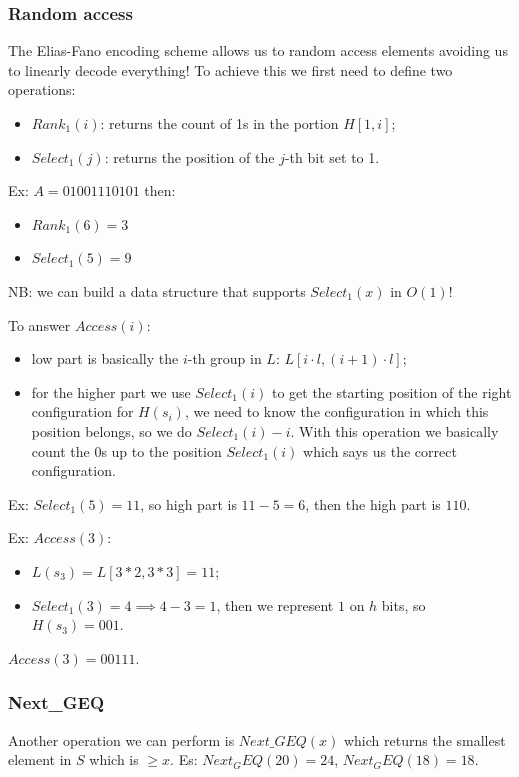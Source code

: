 \subsubsection{Random access}
The Elias-Fano encoding scheme allows us to random access elements avoiding us to linearly decode everything!
To achieve this we first need to define two operations:
\begin{itemize}
    \item $Rank_1(i)$: returns the count of 1s in the portion $H[1, i]$;
    \item $Select_1(j)$: returns the position of the $j$-th bit set to 1.
\end{itemize}

Ex: $A = 01001110101$ then:
\begin{itemize}
    \item $Rank_1(6) = 3$
    \item $Select_1(5) = 9$
\end{itemize}

NB: we can build a data structure that supports $Select_1(x)$ in $O(1)$!

To answer $Access(i)$:
\begin{itemize}
    \item low part is basically the $i$-th group in $L$: $L[i\cdot l, (i+1) \cdot l]$;
    \item for the higher part we use $Select_1(i)$ to get the starting position of the right configuration for $H(s_i)$, we need to know the configuration in which this position belongs, so we do $Select_1(i) - i$. With this operation we basically count the $0$s up to the position $Select_1(i)$ which says us the correct configuration.
\end{itemize}

Ex: $Select_1(5) = 11$, so high part is $11-5 = 6$, then the high part is $110$.

Ex: $Access(3)$:
\begin{itemize}
    \item $L(s_3) = L[3*2, 3*3] = 11$;
    \item $Select_1(3) = 4 \implies 4-3 = 1$, then we represent $1$ on $h$ bits, so $H(s_3) = 001$.
\end{itemize}
$Access(3) = 001 11$.

\subsubsection{Next\_GEQ}
Another operation we can perform is $Next\_GEQ(x)$ which returns the smallest element in $S$ which is $\geq x$.
Es: $Next_GEQ(20) = 24$, $Next_GEQ(18)=18$.

